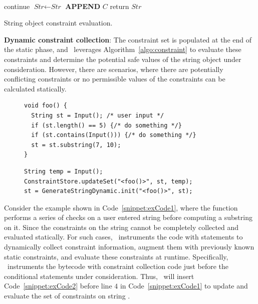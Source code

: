 \begin{mylist}
\begin{algorithm}[t]
{     {
         {\\
          \mytab  continue
        }
        $\textit{Str} \leftarrow \textit{Str}$ {\bf APPEND} $C$
    }
    return $\textit{Str}$
}
\caption{String object constraint evaluation.}
\label{algo:constraint}
\end{algorithm}

 \item \textbf{Dynamic constraint collection}: The constraint set is populated
at the end of the static phase, and \tool\ leverages
Algorithm~\ref{algo:constraint} to evaluate these constraints and determine the
potential safe values of the string object under consideration. However, there
are scenarios, where there are potentially conflicting constraints or no
permissible values of the constraints can be calculated statically.

\lstset{language=Java, caption=Code requiring dynamic string constraint
evaluation., label =
snippet:exCode1, firstnumber =1}
\begin{figure}[t]
\begin{lstlisting}
void foo() {
  String st = Input(); /* user input */
  if (st.length() == 5) {/* do something */}
  if (st.contains(Input())) {/* do something */}
  st = st.substring(7, 10);
}
\end{lstlisting}
\end{figure}

\begin{figure}[t]
\begin{lstlisting}
String temp = Input();
ConstraintStore.updateSet("<foo()>", st, temp);
st = GenerateStringDynamic.init("<foo()>", st);
\end{lstlisting}
\end{figure}

Consider the example shown in Code~\ref{snippet:exCode1}, where the function
 performs a series of checks on a user entered string before computing
a substring on it. Since the constraints on the string  cannot be
completely collected and evaluated statically. For such cases, \tool\
instruments the code with statements to dynamically collect constraint
information, augment them with previously known static constraints, and evaluate
these constraints at runtime. Specifically, \tool\ instruments the bytecode
with constraint collection code just before the conditional statements under
consideration. Thus, \tool\ will insert Code~\ref{snippet:exCode2} before line
$4$ in Code~\ref{snippet:exCode1} to update and evaluate the set of constraints
on string \code{st}.

\end{mylist}

